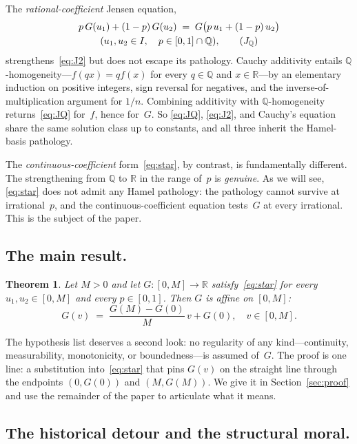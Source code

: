 \documentclass{article}
\theoremstyle{plain}
\newtheorem{theorem}{Theorem}
\theoremstyle{definition}
\newcommand{\R}{\mathbb{R}}
\newcommand{\Q}{\mathbb{Q}}
\begin{document}
The \emph{rational-coefficient} Jensen equation,
\begin{multline}
p\,G(u_1)+(1-p)\,G(u_2)
  \;=\; G\bigl(p\,u_1+(1-p)\,u_2\bigr) \\
  (u_1,u_2\in I,\quad p\in[0,1]\cap\Q),
\tag{$J_\Q$}\label{eq:JQ}
\end{multline}
strengthens~\eqref{eq:J2} but does not escape its pathology. Cauchy
additivity entails $\Q$-homogeneity---$f(qx)=qf(x)$ for every $q\in\Q$
and $x\in\R$---by an elementary induction on positive integers, sign
reversal for negatives, and the inverse-of-multiplication argument for
$1/n$. Combining additivity with $\Q$-homogeneity
returns~\eqref{eq:JQ} for~$f$, hence for~$G$. So \eqref{eq:JQ},
\eqref{eq:J2}, and Cauchy's equation share the same solution class up to
constants, and all three inherit the Hamel-basis pathology.

The \emph{continuous-coefficient} form~\eqref{eq:star}, by contrast, is
fundamentally different. The strengthening from $\Q$ to $\R$ in the
range of~$p$ is \emph{genuine}. As we will see, \eqref{eq:star} does not
admit any Hamel pathology: the pathology cannot survive at irrational~$p$,
and the continuous-coefficient equation tests~$G$ at every irrational.
This is the subject of the paper.

\subsection{The main result.}

\begin{theorem}\label{thm:main}
Let $M>0$ and let $G\colon[0,M]\to\R$ satisfy~\eqref{eq:star} for every
$u_1,u_2\in[0,M]$ and every $p\in[0,1]$. Then $G$ is affine on $[0,M]$:
\[
G(v) \;=\; \frac{G(M)-G(0)}{M}\,v + G(0), \quad v\in[0,M].
\]
\end{theorem}

The hypothesis list deserves a second look: no regularity of any
kind---continuity, measurability, monotonicity, or boundedness---is
assumed of~$G$. The proof is one line: a substitution into~\eqref{eq:star} that pins
$G(v)$ on the straight line through the endpoints $(0,G(0))$ and
$(M,G(M))$.
We give it in Section~\ref{sec:proof} and use the remainder of the paper
to articulate what it means.

\subsection{The historical detour and the structural moral.}
\label{ssec:detour}
\end{document}
